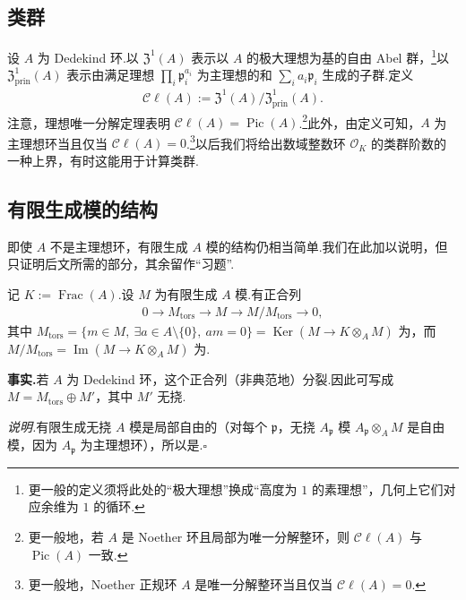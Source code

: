 \subsection{类群}\label{sec:nt-3-3-5}
设 $A$ 为 Dedekind 环.以 $\mathfrak Z^1(A)$ 表示以 $A$ 的极大理想为基的自由 Abel 群，\footnote{更一般的定义须将此处的``极大理想''换成``高度为 $1$ 的素理想''，几何上它们对应余维为 $1$ 的循环.}以 $\mathfrak Z^1_{\mathrm{prin}}(A)$ 表示由满足理想 $\prod_i\mathfrak p_i^{a_i}$ 为主理想的和 $\sum_i a_i\mathfrak p_i$ 生成的子群.定义
\begin{align*}
\mathcal C\ell(A):=\mathfrak Z^1(A)/\mathfrak Z^1_{\mathrm{prin}}(A).
\end{align*}
注意，理想唯一分解定理表明 $\mathcal C\ell(A)=\operatorname{Pic}(A)$.\footnote{更一般地，若 $A$ 是 Noether 环且局部为唯一分解整环，则 $\mathcal C\ell(A)$ 与 $\operatorname{Pic}(A)$ 一致.}此外，由定义可知，$A$ 为主理想环当且仅当 $\mathcal C\ell(A)=0$.\footnote{更一般地，Noether 正规环 $A$ 是唯一分解整环当且仅当 $\mathcal C\ell(A)=0$.}以后我们将给出数域整数环 $\mathcal O_K$ 的类群阶数的一种上界，有时这能用于计算类群.
\subsection{有限生成模的结构}\label{sec:nt-3-3-6}
即使 $A$ 不是主理想环，有限生成 $A$ 模的结构仍相当简单.我们在此加以说明，但只证明后文所需的部分，其余留作``习题''.

记 $K:=\operatorname{Frac}(A)$.设 $M$ 为有限生成 $A$ 模.有正合列
\begin{align*}
0\longrightarrow M_{\mathrm{tors}}\longrightarrow M\longrightarrow M/M_{\mathrm{tors}}\longrightarrow0,
\end{align*}
其中 $M_{\mathrm{tors}}=\{m\in M,\ \exists a\in A\setminus\{0\},\ am=0\}=\operatorname{Ker}(M\longrightarrow K\otimes_A M)$ 为，而 $M/M_{\mathrm{tors}}=\operatorname{Im}(M\longrightarrow K\otimes_A M)$ 为.

\noindent\textbf{事实.}若 $A$ 为 Dedekind 环，这个正合列（非典范地）分裂.因此可写成 $M=M_{\mathrm{tors}}\oplus M'$，其中 $M'$ 无挠.

\noindent\emph{说明.}有限生成无挠 $A$ 模是局部自由的（对每个 $\mathfrak p$，无挠 $A_{\mathfrak p}$ 模 $A_{\mathfrak p}\otimes_A M$ 是自由模，因为 $A_{\mathfrak p}$ 为主理想环），所以是.\hfill$\square$

